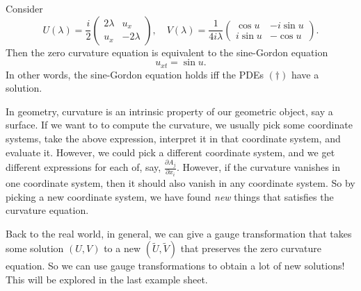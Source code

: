 \documentclass[a4paper]{article}
\begin{document}
\begin{eg}
  Consider
  \[
    U(\lambda) = \frac{i}{2}
    \begin{pmatrix}
      2\lambda & u_x\\
      u_x & -2\lambda
    \end{pmatrix},\quad
    V(\lambda) =
    \frac{1}{4i\lambda}
    \begin{pmatrix}
      \cos u & -i \sin u\\
      i \sin u & -\cos u
    \end{pmatrix}.
  \]
  Then the zero curvature equation is equivalent to the sine-Gordon equation
  \[
    u_{xt} = \sin u.
  \]
  In other words, the sine-Gordon equation holds iff the PDEs $(\dagger)$ have a solution.
\end{eg}
In geometry, curvature is an intrinsic property of our geometric object, say a surface. If we want to to compute the curvature, we usually pick some coordinate systems, take the above expression, interpret it in that coordinate system, and evaluate it. However, we could pick a different coordinate system, and we get different expressions for each of, say, $\frac{\partial A_j}{\partial x_i}$. However, if the curvature vanishes in one coordinate system, then it should also vanish in any coordinate system. So by picking a new coordinate system, we have found \emph{new} things that satisfies the curvature equation.

Back to the real world, in general, we can give a gauge transformation that takes some solution $(U, V)$ to a new $(\tilde{U}, \tilde{V})$ that preserves the zero curvature equation. So we can use gauge transformations to obtain a lot of new solutions! This will be explored in the last example sheet.
\end{document}
